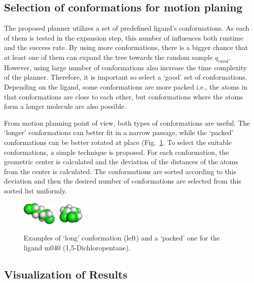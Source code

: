 \documentclass[usletter, 10pt, conference]{ieeeconf} %
\def\qrand{q_{rand}}
\begin{document}
\subsection{Selection of conformations for motion planing}
\label{sec::strat}

The proposed planner utilizes a set of predefined ligand's conformations.
As each of them is tested in the expansion step, this number of influences both runtime and the success rate.
By using more conformations, there is a bigger chance that at least one of them can expand the tree towards the random sample $\qrand$.
However, using large number of conformations also increase the time complexity of the planner.
Therefore, it is important so select a `good' set of conformations.
Depending on the ligand, some conformations are more packed i.e., the atoms in that conformations are close to each other, but 
conformations where the atoms form a longer molecule are also possible.

From motion planning point of view, both types of conformations are useful.
The `longer' conformations can better fit in a narrow passage, while the `packed' conformations can be better rotated at place 
(Fig.~\ref{fig::m040c}.
To select the suitable conformations, a simple technique is proposed.  
For each conformation, the geometric center is calculated and the deviation of the distances of the atoms from the center is calculated.
The conformations are sorted according to this deviation and then the desired number of conformations are selected from this sorted list uniformly.

\begin{figure}
\centering
\includegraphics[width=0.15\textwidth]{fig/m040-conf1} \hskip 25pt
\includegraphics[width=0.12\textwidth]{fig/m040-conf2}
\caption{\label{fig::m040c}
 Examples of `long' conformation (left) and a `packed' one for the ligand m040 (1,5-Dichloropentane).
}
\end{figure}


\subsection{Visualization of Results}
\end{document}
